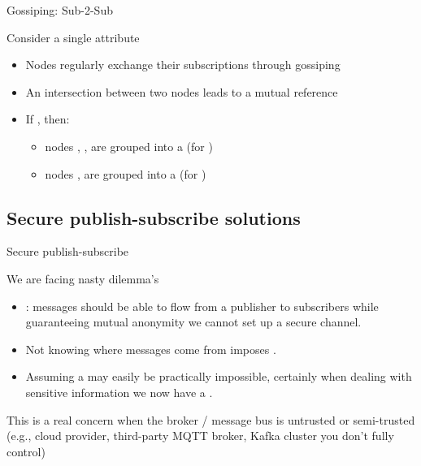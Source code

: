 \begin{frame}{Gossiping: Sub-2-Sub}
  \begin{centerfig}
  \end{centerfig}
  \begin{block}{Consider a single attribute}
    \begin{itemize}
      \item Nodes regularly exchange their subscriptions through gossiping
      \item An intersection between two nodes leads to a mutual reference
      \item If  
            , then:
            \begin{itemize}
              \item nodes , ,  are grouped into a  (for )
              \item nodes ,  are grouped into a  (for
                    )
            \end{itemize}
    \end{itemize}
  \end{block}
\end{frame}

\subsection{Secure publish-subscribe solutions}
\begin{frame}{Secure publish-subscribe}
  \begin{alertblock}{We are facing nasty dilemma's}
    \begin{itemize}
      \item {}: messages should be able to flow from a publisher to subscribers while
            guaranteeing mutual anonymity \mathexpr{\Rightarrow} we cannot set up a secure channel.
      \item Not knowing where messages come from imposes .
      \item Assuming a  may easily be practically impossible, certainly when dealing with
            sensitive information \mathexpr{\Rightarrow} we now have a .
    \end{itemize}
  \end{alertblock}
  This is a real concern when the broker / message bus is untrusted or
  semi-trusted (e.g., cloud provider, third-party MQTT broker,
  Kafka cluster you don’t fully control)
\end{frame}

